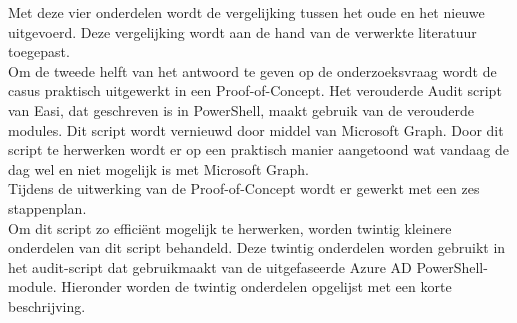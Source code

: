 Met deze vier onderdelen wordt de vergelijking tussen het oude en het nieuwe uitgevoerd. Deze vergelijking wordt aan de hand van de verwerkte literatuur toegepast.  \\

Om de tweede helft van het antwoord te geven op de onderzoeksvraag wordt de casus praktisch uitgewerkt in een Proof-of-Concept. Het verouderde Audit script van Easi, dat geschreven is in PowerShell, maakt gebruik van de verouderde modules. Dit script wordt vernieuwd door middel van Microsoft Graph. Door dit script te herwerken wordt er op een praktisch manier aangetoond wat vandaag de dag wel en niet mogelijk is met Microsoft Graph. \\

Tijdens de uitwerking van de Proof-of-Concept wordt er gewerkt met een zes stappenplan. \\

Om dit script zo efficiënt mogelijk te herwerken, worden twintig kleinere onderdelen van dit script behandeld. Deze twintig onderdelen worden gebruikt in het audit-script dat gebruikmaakt van de uitgefaseerde Azure \ac{AD} PowerShell-module. Hieronder worden de twintig onderdelen opgelijst met een korte beschrijving. \\

